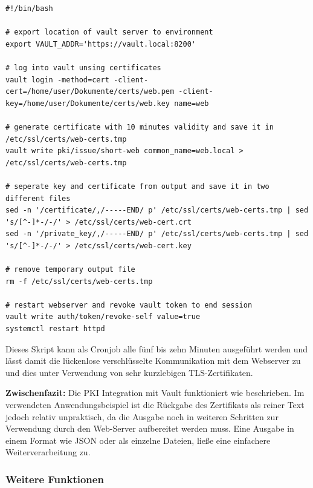 \documentclass[
book,
a4paper,   
titlepage,  
halfparskip,
12pt        
]{scrartcl}
\begin{document}
\begin{onehalfspacing}
\begin{lstlisting}[caption={[Skript PKI] Shell Skript zum Erstellen eines neuen Serverzertifikats unter Verwendung der Vault \ac{PKI}}, label=lst:skript, captionpos=b, basicstyle=\ttfamily] 
#!/bin/bash

# export location of vault server to environment
export VAULT_ADDR='https://vault.local:8200'

# log into vault unsing certificates
vault login -method=cert -client-cert=/home/user/Dokumente/certs/web.pem -client-key=/home/user/Dokumente/certs/web.key name=web

# generate certificate with 10 minutes validity and save it in /etc/ssl/certs/web-certs.tmp
vault write pki/issue/short-web common_name=web.local > /etc/ssl/certs/web-certs.tmp

# seperate key and certificate from output and save it in two different files
sed -n '/certificate/,/-----END/ p' /etc/ssl/certs/web-certs.tmp | sed 's/[^-]*-/-/' > /etc/ssl/certs/web-cert.crt
sed -n '/private_key/,/-----END/ p' /etc/ssl/certs/web-certs.tmp | sed 's/[^-]*-/-/' > /etc/ssl/certs/web-cert.key

# remove temporary output file
rm -f /etc/ssl/certs/web-certs.tmp

# restart webserver and revoke vault token to end session
vault write auth/token/revoke-self value=true
systemctl restart httpd

\end{lstlisting}

Dieses Skript kann als Cronjob alle fünf bis zehn Minuten ausgeführt werden und lässt damit die lückenlose verschlüsselte Kommunikation mit dem Webserver zu und dies unter Verwendung von sehr kurzlebigen \ac{TLS}-Zertifikaten. 

\textbf{Zwischenfazit:} Die PKI Integration mit Vault funktioniert wie beschrieben. Im verwendeten Anwendungsbeispiel ist die Rückgabe des Zertifikats als reiner Text jedoch relativ unpraktisch, da die Ausgabe noch in weiteren Schritten zur Verwendung durch den Web-Server aufbereitet werden muss. Eine Ausgabe in einem Format wie \ac{JSON} oder als einzelne Dateien, ließe eine einfachere Weiterverarbeitung zu.

\subsubsection{Weitere Funktionen}


\end{onehalfspacing}
\end{document}
